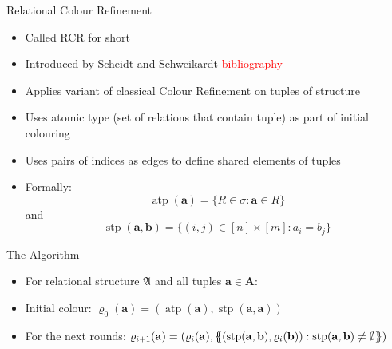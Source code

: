 \documentclass[aspectratio=169]{beamer}
\def\multiset#1{\ensuremath{\left\{\kern-.35em\left\{#1\right\}\kern-.35em\right\}}}
\begin{document}
	\begin{frame}{Relational Colour Refinement}
		\begin{itemize}
			\item Called RCR for short
			\item Introduced by Scheidt and Schweikardt \textcolor{red}{bibliography}
			\item Applies variant of classical Colour Refinement on tuples of structure
			\item Uses atomic type (set of relations that contain tuple) as part of initial colouring
			\item Uses pairs of indices as edges to define shared elements of tuples
			\item Formally:
			$$\operatorname{atp}(\mathbf a) = \{ R \in \sigma : \mathbf a \in R\}$$
			and
			$$\operatorname{stp}(\mathbf a, \mathbf b)=\{(i,j)\in [n]\times[m] : a_i = b_j\}$$
		\end{itemize}
	\end{frame}
	
	\begin{frame}{The Algorithm}
		\begin{itemize}
			\item For relational structure $\mathfrak A$ and all tuples $\mathbf a\in \mathbf A$:
			\item Initial colour: $\varrho_0(\mathbf a)=(\operatorname{atp}(\mathbf a), \operatorname{stp}(\mathbf a, \mathbf a))$
			\item For the next rounds: $\varrho_{i+1}(\mathbf a)=(\varrho_i(\mathbf a), \multiset{(\operatorname{stp}(\mathbf a,\mathbf b), \varrho_i(\mathbf b)) : \operatorname{stp}(\mathbf a,\mathbf b)\neq\emptyset})$
		\end{itemize}
	\end{frame}
	
\end{document}
